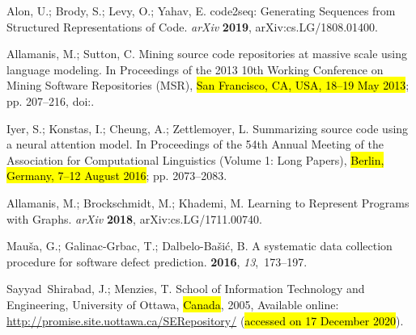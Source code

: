 \documentclass[mathematics,review,accept,moreauthors,pdftex]{Definitions/mdpi}
\begin{document}
\begin{thebibliography}{999}
Alon, U.; Brody, S.; Levy, O.; Yahav, E.
\newblock code2seq: Generating Sequences from Structured Representations of
  Code. \emph{arXiv} \textbf{2019}, arXiv:cs.LG/1808.01400.

{Allamanis}, M.; {Sutton}, C.
\newblock Mining source code repositories at massive scale using language
  modeling.
\newblock In Proceedings of the 2013 10th Working Conference on Mining Software Repositories (MSR),
  \hl{San Francisco, CA, USA, 18--19 May 2013}; pp. 207--216,
\newblock
  doi:{\href{https://doi.org/10.1109/MSR.2013.6624029}{}}.

Iyer, S.; Konstas, I.; Cheung, A.; Zettlemoyer, L.
\newblock Summarizing source code using a neural attention model.
\newblock In Proceedings of the 54th Annual Meeting of the Association for
  Computational Linguistics (Volume 1: Long Papers), \hl{Berlin, Germany, 7--12 August 2016}; pp. 2073--2083.

Allamanis, M.; Brockschmidt, M.; Khademi, M.
\newblock Learning to Represent Programs with Graphs. \emph{arXiv} \textbf{2018},
arXiv:cs.LG/1711.00740.

Mau{\v{s}}a, G.; Galinac-Grbac, T.; Dalbelo-Ba{\v{s}}i{\'c}, B.
\newblock A systematic data collection procedure for software defect
  prediction.
 {\bf 2016}, {\em
  13},~173--197.

Sayyad~Shirabad, J.; Menzies, T.
\newblock School of Information Technology and Engineering, University of
  Ottawa, \hl{Canada},  2005,
Available online: 
\newblock \url{http://promise.site.uottawa.ca/SERepository/} (\hl{accessed on 17 December 2020}).


\end{thebibliography}
\end{document}
